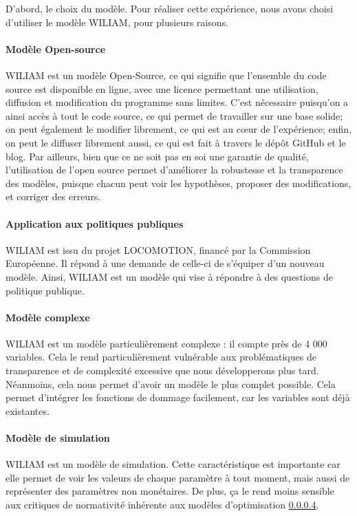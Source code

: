 D'abord, le choix du modèle. Pour réaliser cette expérience, nous avons choisi d'utiliser le modèle WILIAM, pour plusieurs raisons. 

\paragraph{Modèle Open-source} WILIAM est un modèle Open-Source, ce qui signifie que l'ensemble du code source est disponible en ligne, avec une licence permettant une utilisation, diffusion et modification du programme sans limites. C'est nécessaire puisqu'on a ainsi accès à tout le code source, ce qui permet de travailler sur une base solide; on peut également le modifier librement, ce qui est au cœur de l'expérience; enfin, on peut le diffuser librement aussi, ce qui est fait à travers le dépôt GitHub et le blog. Par ailleurs, bien que ce ne soit pas en soi une garantie de qualité, l'utilisation de l'open source permet d'améliorer la robustesse et la transparence des modèles, puisque chacun peut voir les hypothèses, proposer des modifications, et corriger des erreurs. 

\paragraph{Application aux politiques publiques} WILIAM est issu du projet LOCOMOTION, financé par la Commission Européenne. Il répond à une demande de celle-ci de s'équiper d'un nouveau modèle. Ainsi, WILIAM est un modèle qui vise à répondre à des questions de politique publique. 

\paragraph{Modèle complexe} WILIAM est un modèle particulièrement complexe : il compte près de 4 000 variables. Cela le rend particulièrement vulnérable aux problématiques de transparence et de complexité excessive que nous développerons plus tard. Néanmoins, cela nous permet d'avoir un modèle le plus complet possible. Cela permet d'intégrer les fonctions de dommage facilement, car les variables sont déjà existantes. 

\paragraph{Modèle de simulation} WILIAM est un modèle de simulation. Cette caractéristique est importante car elle permet de voir les valeurs de chaque paramètre à tout moment, mais aussi de représenter des paramètres non monétaires. De plus, ça le rend moins sensible aux critiques de normativité inhérente aux modèles d'optimisation \ref{}. 

